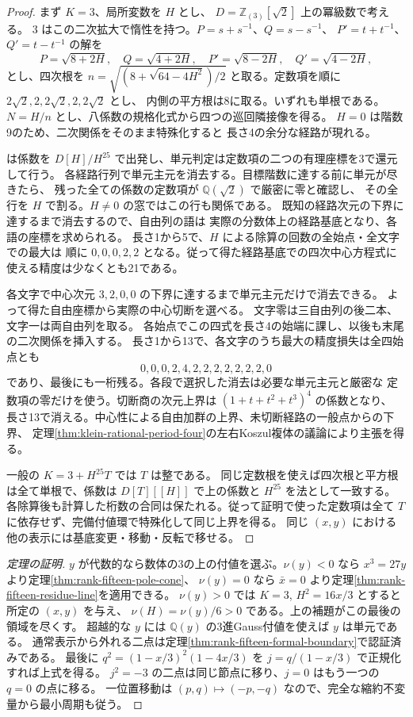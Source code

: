 \begin{proof}
まず $K=3$、局所変数を $H$ とし、
$D=\mathbb Z_{(3)}[\sqrt2]$ 上の冪級数で考える。
$3$ はこの二次拡大で惰性を持つ。$P=s+s^{-1}$、$Q=s-s^{-1}$、
$P'=t+t^{-1}$、$Q'=t-t^{-1}$ の解を
\[
 P=\sqrt{8+2H},\quad Q=\sqrt{4+2H},\quad
 P'=\sqrt{8-2H},\quad Q'=\sqrt{4-2H},
\]
とし、四次根を $n=\sqrt{(8+\sqrt{64-4H^2})/2}$
と取る。定数項を順に $2\sqrt2,2,2\sqrt2,2,2\sqrt2$ とし、
内側の平方根は8に取る。いずれも単根である。
$N=H/n$ とし、八係数の規格化式から四つの巡回隣接像を得る。
$H=0$ は階数9のため、二次関係をそのまま特殊化すると
長さ4の余分な経路が現れる。

 は係数を
$D[H]/H^{25}$ で出発し、単元判定は定数項の二つの有理座標を3で還元して行う。
各経路行列で単元主元を消去する。目標階数に達する前に単元が尽きたら、
残った全ての係数の定数項が $\mathbb Q(\sqrt2)$ で厳密に零と確認し、
その全行を $H$ で割る。$H\ne0$ の窓ではこの行も関係である。
既知の経路次元の下界に達するまで消去するので、自由列の語は
実際の分数体上の経路基底となり、各語の座標を求められる。
長さ1から5で、$H$ による除算の回数の全始点・全文字での最大は
順に $0,0,0,2,2$ となる。従って得た経路基底での四次中心方程式に
使える精度は少なくとも21である。

各文字で中心次元 $3,2,0,0$ の下界に達するまで単元主元だけで消去できる。
よって得た自由座標から実際の中心切断を選べる。
文字零は三自由列の後二本、文字一は両自由列を取る。
各始点でこの四式を長さ4の始端に課し、以後も末尾の二次関係を挿入する。
長さ1から13で、各文字のうち最大の精度損失は全四始点とも
\[
                 0,0,0,2,4,2,2,2,2,2,2,2,0
\]
であり、最後にも一桁残る。各段で選択した消去は必要な単元主元と厳密な
定数項の零だけを使う。切断商の次元上界は $(1+t+t^2+t^3)^4$ の係数となり、
長さ13で消える。中心性による自由加群の上界、未切断経路の一般点からの下界、
定理\ref{thm:klein-rational-period-four}の左右Koszul複体の議論により主張を得る。

一般の $K=3+H^{25}T$ では $T$ は整である。
同じ定数根を使えば四次根と平方根は全て単根で、係数は
$D[T][[H]]$ で上の係数と $H^{25}$ を法として一致する。
各除算後も計算した桁数の合同は保たれる。従って証明で使った定数項は全て
$T$ に依存せず、完備付値環で特殊化して同じ上界を得る。
同じ $(x,y)$ における他の表示には基底変更・移動・反転で移せる。
\end{proof}

\begin{proof}[定理の証明]
$y$ が代数的なら数体の3の上の付値を選ぶ。$\nu(y)<0$ なら
$x^3=27y$ より定理\ref{thm:rank-fifteen-pole-cone}、
$\nu(y)=0$ なら $\bar x=0$ より定理\ref{thm:rank-fifteen-residue-line}を適用できる。
$\nu(y)>0$ では $K=3$, $H^2=16x/3$ とすると所定の $(x,y)$ を与え、
$\nu(H)=\nu(y)/6>0$ である。上の補題がこの最後の領域を尽くす。
超越的な $y$ には $\mathbb Q(y)$ の3進Gauss付値を使えば $y$ は単元である。
通常表示から外れる二点は定理\ref{thm:rank-fifteen-formal-boundary}で認証済みである。
最後に $q^2=(1-x/3)^2(1-4x/3)$ を $j=q/(1-x/3)$ で正規化すれば上式を得る。
$j^2=-3$ の二点は同じ節点に移り、$j=0$ はもう一つの $q=0$ の点に移る。
一位置移動は $(p,q)\mapsto(-p,-q)$ なので、完全な縮約不変量から最小周期も従う。
\end{proof}

